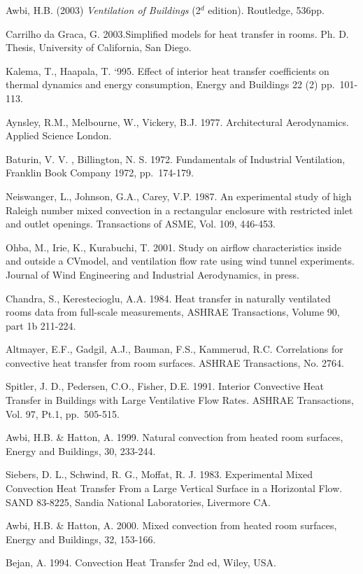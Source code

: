 Awbi, H.B. (2003) \emph{Ventilation of Buildings} (2\(^{d}\) edition). Routledge, 536pp.

Carrilho da Graca, G. 2003.Simplified models for heat transfer in rooms. Ph. D. Thesis, University of California, San Diego.

Kalema, T., Haapala, T. `995. Effect of interior heat transfer coefficients on thermal dynamics and energy consumption, Energy and Buildings 22 (2) pp.~101-113.

Aynsley, R.M., Melbourne, W., Vickery, B.J. 1977. Architectural Aerodynamics. Applied Science London.

Baturin, V. V. , Billington, N. S. 1972. Fundamentals of Industrial Ventilation, Franklin Book Company 1972, pp.~174-179.

Neiswanger, L., Johnson, G.A., Carey, V.P. 1987. An experimental study of high Raleigh number mixed convection in a rectangular enclosure with restricted inlet and outlet openings. Transactions of ASME, Vol. 109, 446-453.

Ohba, M., Irie, K., Kurabuchi, T. 2001. Study on airflow characteristics inside and outside a CVmodel, and ventilation flow rate using wind tunnel experiments. Journal of Wind Engineering and Industrial Aerodynamics, in press.

Chandra, S., Kerestecioglu, A.A. 1984. Heat transfer in naturally ventilated rooms data from full-scale measurements, ASHRAE Transactions, Volume 90, part 1b 211-224.

Altmayer, E.F., Gadgil, A.J., Bauman, F.S., Kammerud, R.C. Correlations for convective heat transfer from room surfaces. ASHRAE Transactions, No. 2764.

Spitler, J. D., Pedersen, C.O., Fisher, D.E. 1991. Interior Convective Heat Transfer in Buildings with Large Ventilative Flow Rates. ASHRAE Transactions, Vol. 97, Pt.1, pp.~505-515.

Awbi, H.B. \& Hatton, A. 1999. Natural convection from heated room surfaces, Energy and Buildings, 30, 233-244.

Siebers, D. L., Schwind, R. G., Moffat, R. J. 1983. Experimental Mixed Convection Heat Transfer From a Large Vertical Surface in a Horizontal Flow. SAND 83-8225, Sandia National Laboratories, Livermore CA.

Awbi, H.B. \& Hatton, A. 2000. Mixed convection from heated room surfaces, Energy and Buildings, 32, 153-166.

Bejan, A. 1994. Convection Heat Transfer 2nd ed, Wiley, USA.


